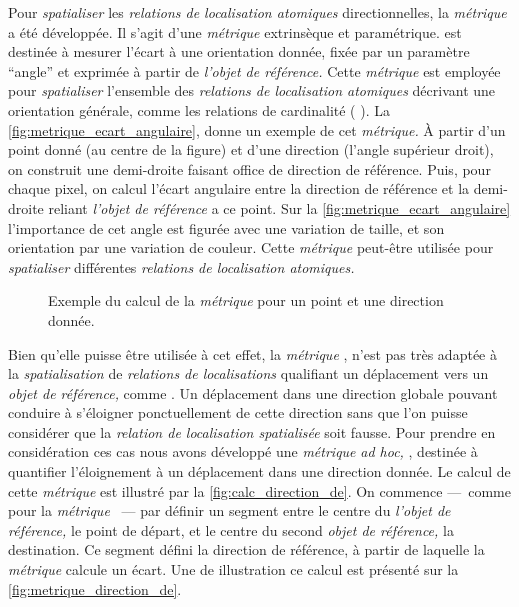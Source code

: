 Pour \emph{spatialiser} les \emph{relations de localisation atomiques}
directionnelles, la \emph{métrique}  a été
développée. Il s'agit d'une \emph{métrique} extrinsèque et
paramétrique.  est destinée à mesurer l'écart à
une orientation donnée, fixée par un paramètre \enquote{angle} et
exprimée à partir de \emph{l'objet de référence.} Cette
\emph{métrique} est employée pour \emph{spatialiser} l'ensemble des
\emph{relations de localisation atomiques} décrivant une orientation
générale, comme les relations de cardinalité (\eg
{}). La \autoref{fig:metrique_ecart_angulaire},
donne un exemple de cet \emph{métrique.} À partir d'un point donné (au
centre de la figure) et d'une direction (l'angle supérieur droit), on
construit une demi-droite faisant office de direction de
référence. Puis, pour chaque pixel, on calcul l'écart angulaire entre
la direction de référence et la demi-droite reliant \emph{l'objet de
  référence} a ce point. Sur la \autoref{fig:metrique_ecart_angulaire}
l'importance de cet angle est figurée avec une variation de taille, et
son orientation par une variation de couleur. Cette \emph{métrique}
peut-être utilisée pour \emph{spatialiser} différentes \emph{relations
  de localisation atomiques.}

\begin{figure}
  \centering
  
  \caption{Exemple du calcul de la \emph{métrique}
    \protect{} pour un point et une direction
    donnée.}
  \label{fig:metrique_ecart_angulaire}
\end{figure}

Bien qu'elle puisse être utilisée à cet effet, la \emph{métrique}
, n'est pas très adaptée à la
\emph{spatialisation} de \emph{relations de localisations} qualifiant
un déplacement vers un \emph{objet de référence,} comme
. Un déplacement dans une direction
globale pouvant conduire à s'éloigner ponctuellement de cette
direction sans que l'on puisse considérer que la \emph{relation de
  localisation spatialisée} soit fausse. Pour prendre en considération
ces cas nous avons développé une \emph{métrique} \emph{ad hoc,}
, destinée à quantifier l'éloignement à un
déplacement dans une direction donnée. Le calcul de cette
\emph{métrique} est illustré par la
\autoref{fig:calc_direction_de}. On commence ---~comme pour la
\emph{métrique} ~--- par définir un segment
entre le centre du \emph{l'objet de référence,} le point de départ, et
le centre du second \emph{objet de référence,} la destination. Ce
segment défini la direction de référence, à partir de laquelle la
\emph{métrique} calcule un écart. 
%
Une de illustration ce calcul est présenté sur la
\autoref{fig:metrique_direction_de}.

